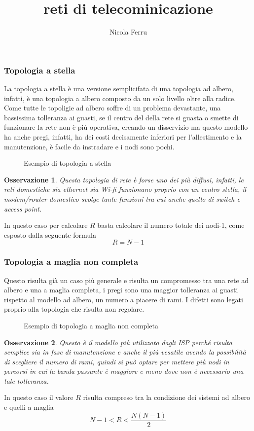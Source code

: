 \documentclass{book}
\title{reti di telecominicazione}
\author{Nicola Ferru}
\newtheorem{oss}{Osservazione}[section]
\begin{document}

\tableofcontents

\clearpage
\subsubsection{Topologia a stella}
\label{sec:topastellaegrafo}
La topologia a stella è una versione semplicifata di una topologia ad albero,
infatti, è una topologia a albero composto da un solo livello oltre alla radice.
Come tutte le topoligie ad albero soffre di un problema devastante, una bassissima
tolleranza ai guasti, se il centro del della rete si guasta o smette di funzionare
la rete non è più operativa, creando un disservizio ma questo modello ha anche pregi,
infatti, ha dei costi decisamente inferiori per l'allestimento e la manutenzione,
è facile da instradare e i nodi sono pochi.
\begin{figure}[ht]
  \centering
  
  \caption{Esempio di topologia a stella}
  \label{fig:stellaesempio}
\end{figure}

\begin{oss}
  Questa topologia di rete è forse uno dei più diffusi, infatti, le reti domestiche sia
  ethernet sia Wi-fi funzionano proprio con un centro stella, il modem/router domestico
  svolge tante funzioni tra cui anche quello di switch e access point.
\end{oss}
In questo caso per calcolare $R$ basta calcolare il numero totale dei nodi-1, come
esposto dalla seguente formula
\begin{equation}
  \label{eq:stella}
  R=N-1
\end{equation}

\subsubsection{Topologia a maglia non completa}
\label{sec:topologiaamaglianoncompleta}
Questo risulta già un caso più generale e risulta un compromesso
tra una rete ad albero e una a maglia completa, i pregi sono una maggior
tolleranza ai guasti rispetto al modello ad albero, un numero a piacere di
rami. I difetti sono legati proprio alla topologia che risulta non regolare.
\begin{figure}[ht]
  \centering
  
  \caption{Esempio di topologia a maglia non completa}
  \label{fig:topologiaamagliacompletanoncomp}
\end{figure}
\begin{oss}
  Questo è il modello più utilizzato dagli ISP perché risulta semplice sia in fase
  di manutenzione e anche il più vesatile avendo la possibilità di scegliere il numero
  di rami, quindi si può optare per mettere più nodi in percorsi in cui la banda
  passante è maggiore e meno dove non è necessario una tale tolleranza.
\end{oss}
In questo caso il valore $R$ risulta compreso tra la condizione dei sistemi ad albero e
quelli a maglia
\begin{equation}
  \label{eq:maglianoncompleta}
  N-1 < R < \frac{N(N-1)}{2}
\end{equation}
\clearpage
\end{document}
